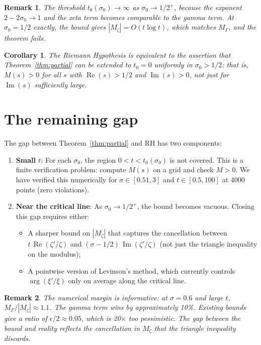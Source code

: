 \documentclass[11pt,a4paper]{article}
\newtheorem{corollary}{Corollary}
\newtheorem{remark}{Remark}
\DeclareMathOperator{\re}{Re}
\DeclareMathOperator{\im}{Im}
\begin{document}
\begin{remark}
The threshold $t_0(\sigma_0) \to \infty$ as
$\sigma_0 \to 1/2^+$, because the exponent
$2 - 2\sigma_0 \to 1$ and the zeta term becomes comparable to the
gamma term. At $\sigma_0 = 1/2$ exactly, the bound gives
$|M_\zeta| = O(t\log t)$, which matches $M_\Gamma$, and the
theorem fails.
\end{remark}

\begin{corollary}
The Riemann Hypothesis is equivalent to the assertion that
Theorem~\ref{thm:partial} can be extended to $t_0 = 0$
uniformly in $\sigma_0 > 1/2$: that is, $M(s) > 0$ for
\emph{all} $s$ with $\re(s) > 1/2$ and $\im(s) > 0$, not
just for $\im(s)$ sufficiently large.
\end{corollary}

\section{The remaining gap}

The gap between Theorem~\ref{thm:partial} and RH has two
components:

\begin{enumerate}
\item \textbf{Small $t$}: For each $\sigma_0$, the region
  $0 < t < t_0(\sigma_0)$ is not covered. This is a finite
  verification problem: compute $M(s)$ on a grid and check
  $M > 0$. We have verified this numerically for $\sigma \in
  [0.51, 3]$ and $t \in [0.5, 100]$ at 4000 points (zero
  violations).

\item \textbf{Near the critical line}: As $\sigma_0 \to 1/2^+$,
  the bound becomes vacuous. Closing this gap requires either:
  \begin{itemize}
    \item A sharper bound on $|M_\zeta|$ that captures the
      cancellation between $t\,\re(\zeta'/\zeta)$ and
      $(\sigma-1/2)\,\im(\zeta'/\zeta)$ (not just the triangle
      inequality on the modulus);
    \item A pointwise version of Levinson's method, which
      currently controls $\arg(\xi'/\xi)$ only on average along
      the critical line.
  \end{itemize}
\end{enumerate}

\begin{remark}
The numerical margin is informative: at $\sigma = 0.6$ and large
$t$, $M_\Gamma / |M_\zeta| \approx 1.1$. The gamma term wins by
approximately 10\%. Existing bounds give a ratio of
$\epsilon/2 \approx 0.05$, which is 20$\times$ too pessimistic.
The gap between the bound and reality reflects the cancellation
in $M_\zeta$ that the triangle inequality discards.
\end{remark}
\end{document}
